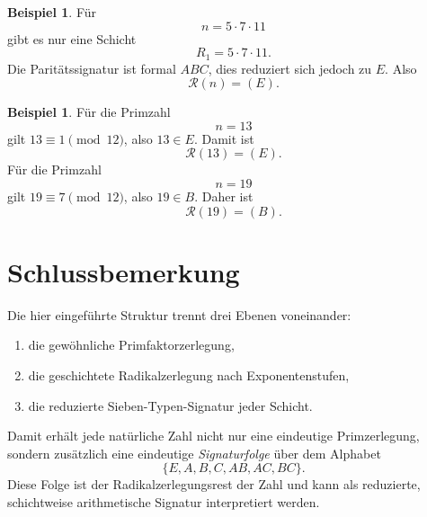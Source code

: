 \documentclass[11pt,a4paper]{article}
\theoremstyle{definition}
\newtheorem{beispiel}[satz]{Beispiel}
\theoremstyle{remark}
\newcommand{\Rest}{\mathcal{R}}
\begin{document}
	\begin{beispiel}
		Für
		\[
		n=5\cdot 7\cdot 11
		\]
		gibt es nur eine Schicht
		\[
		R_1=5\cdot 7\cdot 11.
		\]
		Die Paritätssignatur ist formal \(ABC\), dies reduziert sich jedoch zu \(E\). Also
		\[
		\Rest(n)=(E).
		\]
	\end{beispiel}
	
	\begin{beispiel}
		Für die Primzahl
		\[
		n=13
		\]
		gilt \(13\equiv 1\pmod{12}\), also \(13\in E\). Damit ist
		\[
		\Rest(13)=(E).
		\]
		Für die Primzahl
		\[
		n=19
		\]
		gilt \(19\equiv 7\pmod{12}\), also \(19\in B\). Daher ist
		\[
		\Rest(19)=(B).
		\]
	\end{beispiel}
	
	\section{Schlussbemerkung}
	
	Die hier eingeführte Struktur trennt drei Ebenen voneinander:
	\begin{enumerate}[label=\arabic*.,itemsep=0.25em]
		\item die gewöhnliche Primfaktorzerlegung,
		\item die geschichtete Radikalzerlegung nach Exponentenstufen,
		\item die reduzierte Sieben-Typen-Signatur jeder Schicht.
	\end{enumerate}
	
	Damit erhält jede natürliche Zahl nicht nur eine eindeutige Primzerlegung, sondern zusätzlich eine
	eindeutige \emph{Signaturfolge} über dem Alphabet
	\[
	\{E,A,B,C,AB,AC,BC\}.
	\]
	Diese Folge ist der Radikalzerlegungsrest der Zahl und kann als reduzierte, schichtweise
	arithmetische Signatur interpretiert werden.
	
\end{document}
